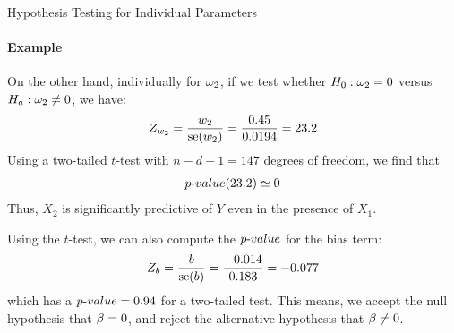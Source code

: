 \begin{frame}{Hypothesis Testing for Individual Parameters}
\framesubtitle{Example}

    On the other hand, individually for $\omega_2$, if we test whether $H_0: \omega_2 = 0$
    versus $H_a: \omega_2 \ne 0$, we have:
    \begin{align*}
        Z_{w_2} = \frac{w_2}{\operatorname{se}(w_2)}  =
        \frac{0.45}{0.0194} = 23.2
    \end{align*}
    Using a two-tailed $t$-test with $n-d-1=147$ degrees of freedom, we
    find that
    \begin{align*}
        {p\text{-}value}(23.2) \simeq 0
    \end{align*}
    Thus, $X_2$ is significantly predictive of
    $Y$ even in the presence of $X_1$. 

	\medskip
    
    Using the $t$-test, we can also compute the ${p\text{-}value}$ for the bias
    term:
    \begin{align*}
        Z_{b} = \frac{b}{\operatorname{se}(b)}  =
        \frac{-0.014}{0.183} = -0.077
    \end{align*}
    which has a ${p\text{-}value}=0.94$ for a two-tailed test. This means, we
    accept the null hypothesis that $\beta=0$, and reject the alternative
    hypothesis that $\beta\ne 0$.
\end{frame}
%
%
%
